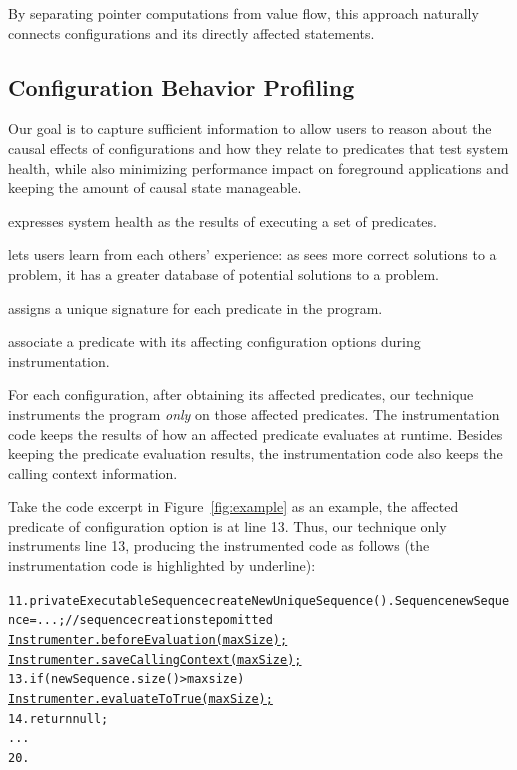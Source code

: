 
By separating pointer computations from value flow,
this approach naturally connects configurations and its
directly affected statements.


\subsection{Configuration Behavior Profiling}
\label{sec:profiling}

Our goal is to capture sufficient information to allow users to reason
about the causal effects of configurations and how they relate to
predicates that test system health, while also minimizing performance impact
on foreground applications and keeping the amount of causal state manageable.

\ourtool expresses system health as the results of executing a set of predicates.

\ourtool lets users learn from each others' experience: as \ourtool sees more correct
solutions to a problem, it has a greater database of potential solutions to
a problem.

\ourtool assigns a unique signature for each predicate in the program.

associate a predicate with its affecting configuration options during instrumentation.

For each configuration, after obtaining its affected predicates, our technique
instruments the program \textit{only} on those affected predicates. The instrumentation
code keeps the results of how an affected predicate evaluates at runtime. Besides keeping
the predicate evaluation results, the instrumentation code also keeps
the calling context information.

Take the code excerpt in Figure~\ref{fig:example} as an example, the affected
predicate of configuration option  is at line 13. Thus, our technique
only instruments line 13, producing the instrumented
code as follows (the instrumentation code is highlighted by underline):


\begin{CodeOut}
\begin{alltt}
11. private ExecutableSequence createNewUniqueSequence() .   Sequence newSequence = ...; //sequence creation step omitted
      \underline{Instrumenter.beforeEvaluation(maxSize);}
      \underline{Instrumenter.saveCallingContext(maxSize);}
13.   if (newSequence.size() > maxsize) \ttlcb
        \underline{Instrumenter.evaluateToTrue(maxSize);}
14.     return null;
      ...
20. \ttrcb
\end{alltt}
\end{CodeOut}

